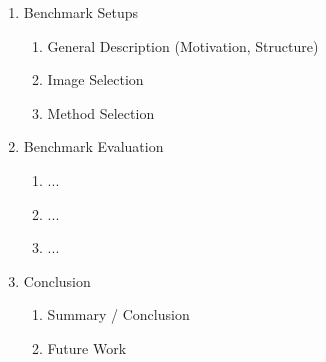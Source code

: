 \begin{enumerate}
	\item Benchmark Setups
	\begin{enumerate}
		\item General Description (Motivation, Structure)
		\item Image Selection
		\item Method Selection
	\end{enumerate}
	
	
	\item Benchmark Evaluation
	\begin{enumerate}
		\item ...
		\item ...
		\item ...
	\end{enumerate}
	
	
	\item Conclusion
	\begin{enumerate}
		\item Summary / Conclusion
		\item Future Work
	\end{enumerate}
	
\end{enumerate}
